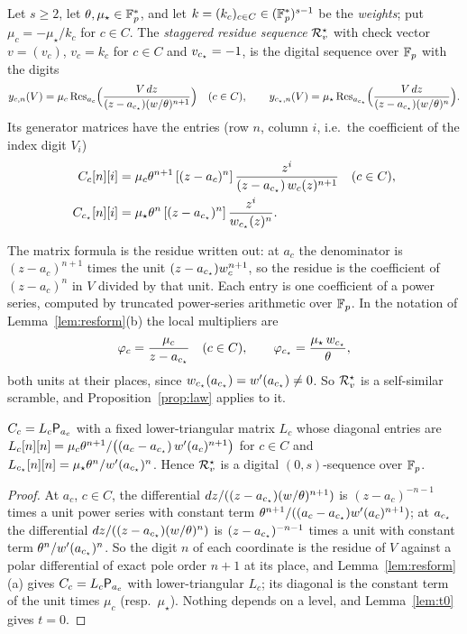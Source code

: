 \begin{definition}\label{def:residuestar}
Let $s\ge2$, let $\theta,\mu_\star\in\mathbb{F}_p^*$, and let $k=(k_c)_{c\in C}\in(\mathbb{F}_p^*)^{s-1}$ be the \emph{weights}; put $\mu_c=-\mu_\star/k_c$ for $c\in C$. The \emph{staggered residue sequence} $\mathcal{R}^{\star}_v$ with check vector $v=(v_c)$, $v_c=k_c$ for $c\in C$ and $v_{c_{\star}}=-1$, is the digital sequence over $\mathbb{F}_p$ with the digits
\[
y_{c,n}(V)=\mu_c\operatorname{Res}_{a_c}\Bigl(\frac{V\,dz}{(z-a_{c_{\star}})(w/\theta)^{n+1}}\Bigr)\quad(c\in C),\qquad y_{c_{\star},n}(V)=\mu_\star\operatorname{Res}_{a_{c_{\star}}}\Bigl(\frac{V\,dz}{(z-a_{c_{\star}})(w/\theta)^{n}}\Bigr).
\]
Its generator matrices have the entries (row $n$, column $i$, i.e.\ the coefficient of the index digit $V_i$)
\[
\begin{aligned}
C_c[n][i]&=\mu_c\theta^{n+1}\,[(z-a_c)^n]\,\frac{z^i}{(z-a_{c_{\star}})\,w_c(z)^{n+1}}\quad(c\in C),\\
C_{c_{\star}}[n][i]&=\mu_\star\theta^{n}\,[(z-a_{c_{\star}})^n]\,\frac{z^i}{w_{c_{\star}}(z)^{n}}.
\end{aligned}
\]
\end{definition}

The matrix formula is the residue written out: at $a_c$ the denominator is $(z-a_c)^{n+1}$ times the unit $(z-a_{c_{\star}})w_c^{n+1}$, so the residue is the coefficient of $(z-a_c)^n$ in $V$ divided by that unit. Each entry is one coefficient of a power series, computed by truncated power-series arithmetic over $\mathbb{F}_p$. In the notation of Lemma~\ref{lem:resform}(b) the local multipliers are
\[
\varphi_c=\frac{\mu_c}{z-a_{c_{\star}}}\quad(c\in C),\qquad \varphi_{c_{\star}}=\frac{\mu_\star\,w_{c_{\star}}}{\theta},
\]
both units at their places, since $w_{c_{\star}}(a_{c_{\star}})=w'(a_{c_{\star}})\ne0$. So $\mathcal{R}^{\star}_v$ is a self-similar scramble, and Proposition~\ref{prop:law} applies to it.

\begin{lemma}[Staggered residue sequences have $t=0$]\label{lem:residuestar-t0}
$C_c=L_c\mathsf{P}_{a_c}$ with a fixed lower-triangular matrix $L_c$ whose diagonal entries are $L_c[n][n]=\mu_c\theta^{n+1}/\bigl((a_c-a_{c_{\star}})\,w'(a_c)^{n+1}\bigr)$ for $c\in C$ and $L_{c_{\star}}[n][n]=\mu_\star\theta^n/w'(a_{c_{\star}})^n$. Hence $\mathcal{R}^{\star}_v$ is a digital $(0,s)$-sequence over $\mathbb{F}_p$.
\end{lemma}

\begin{proof}
At $a_c$, $c\in C$, the differential $dz/((z-a_{c_{\star}})(w/\theta)^{n+1})$ is $(z-a_c)^{-n-1}$ times a unit power series with constant term $\theta^{n+1}/((a_c-a_{c_{\star}})w'(a_c)^{n+1})$; at $a_{c_{\star}}$ the differential $dz/((z-a_{c_{\star}})(w/\theta)^n)$ is $(z-a_{c_{\star}})^{-n-1}$ times a unit with constant term $\theta^n/w'(a_{c_{\star}})^n$. So the digit $n$ of each coordinate is the residue of $V$ against a polar differential of exact pole order $n+1$ at its place, and Lemma~\ref{lem:resform}(a) gives $C_c=L_c\mathsf{P}_{a_c}$ with lower-triangular $L_c$; its diagonal is the constant term of the unit times $\mu_c$ (resp.\ $\mu_\star$). Nothing depends on a level, and Lemma~\ref{lem:t0} gives $t=0$.
\end{proof}

